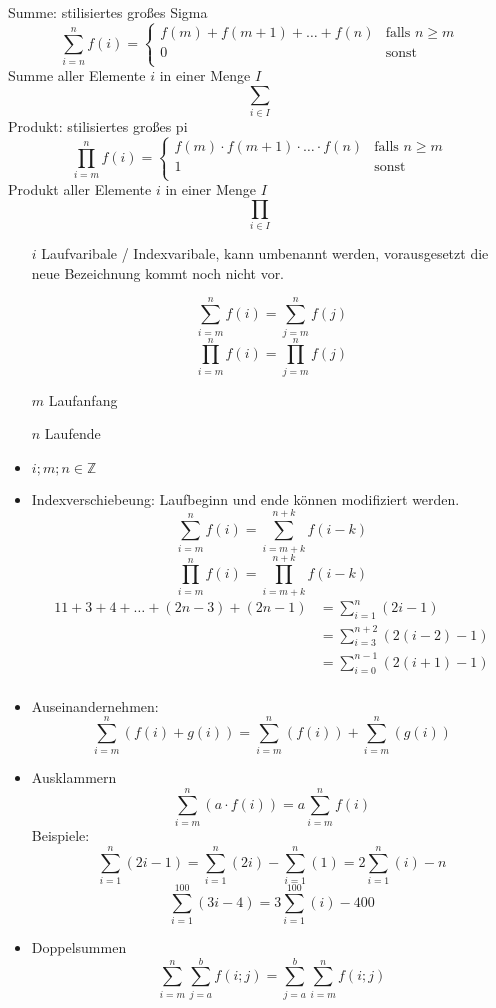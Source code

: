 Summe: stilisiertes großes Sigma
$$\sum\limits_{i = n}^n f(i) = \left \lbrace \begin{array}{ll}
                                                 f(m) + f(m + 1) + \dots + f(n) & \textrm{falls } n \geq m \\
                                                 0                              & \textrm{sonst}           \\
\end{array} \right.$$
Summe aller Elemente $i$ in einer Menge $I$
$$\sum\limits_{i \in I}$$
Produkt: stilisiertes großes pi
$$\prod\limits_{i=m}^{n} f(i) = \left \lbrace \begin{array}{ll}
                                                  f(m) \cdot f(m + 1) \cdot \dots \cdot f(n) & \textrm{falls } n \geq m \\
                                                  1                                          & \textrm{sonst}           \\
\end{array} \right.$$
Produkt aller Elemente $i$ in einer Menge $I$
$$\prod\limits_{i \in I}$$
\begin{itemize}
    \item[$i$] Laufvaribale / Indexvaribale, kann umbenannt werden, vorausgesetzt die neue Bezeichnung kommt noch nicht vor.
    \item[] $$\sum\limits_{i = m}^n f(i) = \sum\limits_{j = m}^n f(j)$$
    $$\prod\limits_{i = m}^n f(i) = \prod\limits_{j = m}^n f(j)$$
    \item[$m$] Laufanfang
    \item[$n$] Laufende
    \item $i;m;n \in \mathbb{Z}$
    \item Indexverschiebeung: Laufbeginn und ende können modifiziert werden.
    $$\sum\limits_{i=m}^n f(i) = \sum\limits_{i=m+k}^{n+k} f(i-k)$$
    $$\prod\limits_{i=m}^n f(i) = \prod\limits_{i=m+k}^{n+k} f(i-k)$$
    \begin{alignat*}{1}
        1+3+4+\dots+(2n-3)+(2n-1) & = \sum\limits_{i = 1}^n (2i-1)             \\
        & = \sum\limits_{i = 3}^{n + 2} (2(i - 2)-1) \\
        & = \sum\limits_{i = 0}^{n - 1} (2(i + 1)-1) \\
    \end{alignat*}
    \item Auseinandernehmen:
    $$\sum\limits_{i=m}^n (f(i) + g(i)) = \sum\limits_{i=m}^n (f(i)) + \sum\limits_{i=m}^n (g(i))$$
    \item Ausklammern
    $$\sum\limits_{i=m}^n (a \cdot f(i)) = a \sum\limits_{i=m}^n f(i)$$
    Beispiele:
    $$\sum\limits_{i=1}^n (2i-1) = \sum\limits_{i=1}^n (2i) - \sum\limits_{i=1}^n (1) = 2\sum\limits_{i=1}^n (i) - n$$
    $$\sum\limits_{i=1}^{100} (3i-4) = 3\sum\limits_{i=1}^{100} (i) - 400$$
    \item Doppelsummen
    $$\sum\limits_{i=m}^n \sum\limits_{j=a}^b f(i; j) = \sum\limits_{j=a}^b \sum\limits_{i=m}^n f(i; j)$$
\end{itemize}